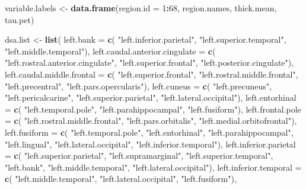 \documentclass[
]{article}
\newenvironment{Shaded}{\begin{snugshade}}{\end{snugshade}}
\newcommand{\DataTypeTok}[1]{\textcolor[rgb]{0.13,0.29,0.53}{#1}}
\newcommand{\DecValTok}[1]{\textcolor[rgb]{0.00,0.00,0.81}{#1}}
\newcommand{\KeywordTok}[1]{\textcolor[rgb]{0.13,0.29,0.53}{\textbf{#1}}}
\newcommand{\NormalTok}[1]{#1}
\newcommand{\OperatorTok}[1]{\textcolor[rgb]{0.81,0.36,0.00}{\textbf{#1}}}
\newcommand{\StringTok}[1]{\textcolor[rgb]{0.31,0.60,0.02}{#1}}
\begin{document}
\begin{Shaded}
\begin{Highlighting}[]
\NormalTok{variable.labels <-}\StringTok{ }\KeywordTok{data.frame}\NormalTok{(}\DataTypeTok{region.id =} \DecValTok{1}\OperatorTok{:}\DecValTok{68}\NormalTok{, region.names, thick.mean, tau.pet)}

\NormalTok{dsa.list <-}\StringTok{ }\KeywordTok{list}\NormalTok{(}
 \DataTypeTok{left.bank =} \KeywordTok{c}\NormalTok{(}
   \StringTok{"left.inferior.parietal"}\NormalTok{, }\StringTok{"left.superior.temporal"}\NormalTok{, }\StringTok{"left.middle.temporal"}\NormalTok{),}
 \DataTypeTok{left.caudal.anterior.cingulate =} \KeywordTok{c}\NormalTok{(}
   \StringTok{"left.rostral.anterior.cingulate"}\NormalTok{, }\StringTok{"left.superior.frontal"}\NormalTok{,}
   \StringTok{"left.posterior.cingulate"}\NormalTok{),}
 \DataTypeTok{left.caudal.middle.frontal =} \KeywordTok{c}\NormalTok{(}
   \StringTok{"left.superior.frontal"}\NormalTok{, }\StringTok{"left.rostral.middle.frontal"}\NormalTok{,}
    \StringTok{"left.precentral"}\NormalTok{, }\StringTok{"left.pars.opercularis"}\NormalTok{),}
 \DataTypeTok{left.cuneus =} \KeywordTok{c}\NormalTok{(}
   \StringTok{"left.precuneus"}\NormalTok{, }\StringTok{"left.pericalcarine"}\NormalTok{,}
   \StringTok{"left.superior.parietal"}\NormalTok{, }\StringTok{"left.lateral.occipital"}\NormalTok{),}
 \DataTypeTok{left.entorhinal =} \KeywordTok{c}\NormalTok{(}
   \StringTok{"left.temporal.pole"}\NormalTok{, }\StringTok{"left.parahippocampal"}\NormalTok{,}
   \StringTok{"left.fusiform"}\NormalTok{),}
 \DataTypeTok{left.frontal.pole =} \KeywordTok{c}\NormalTok{(}
   \StringTok{"left.rostral.middle.frontal"}\NormalTok{, }\StringTok{"left.pars.orbitalis"}\NormalTok{,}
   \StringTok{"left.medial.orbitofrontal"}\NormalTok{),}
 \DataTypeTok{left.fusiform =} \KeywordTok{c}\NormalTok{(}
   \StringTok{"left.temporal.pole"}\NormalTok{, }\StringTok{"left.entorhinal"}\NormalTok{, }\StringTok{"left.parahippocampal"}\NormalTok{,}
   \StringTok{"left.lingual"}\NormalTok{, }\StringTok{"left.lateral.occipital"}\NormalTok{, }\StringTok{"left.inferior.temporal"}\NormalTok{),}
 \DataTypeTok{left.inferior.parietal =} \KeywordTok{c}\NormalTok{(}
   \StringTok{"left.superior.parietal"}\NormalTok{, }\StringTok{"left.supramarginal"}\NormalTok{, }\StringTok{"left.superior.temporal"}\NormalTok{,}
   \StringTok{"left.bank"}\NormalTok{, }\StringTok{"left.middle.temporal"}\NormalTok{, }\StringTok{"left.lateral.occipital"}\NormalTok{),}
 \DataTypeTok{left.inferior.temporal =} \KeywordTok{c}\NormalTok{(}
   \StringTok{"left.middle.temporal"}\NormalTok{, }\StringTok{"left.lateral.occipital"}\NormalTok{, }\StringTok{"left.fusiform"}\NormalTok{),}

\end{Highlighting}
\end{Shaded}
\end{document}
